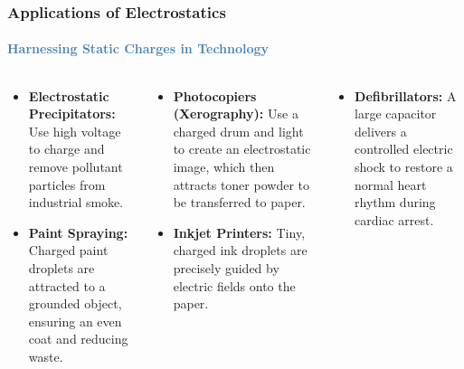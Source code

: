 \begin{frame}
\begin{frame}
\frametitle{\textsf{\textbf{Applications of Electrostatics}}}
\framesubtitle{\textcolor{steelblue}{Harnessing Static Charges in Technology}}

\begin{columns}[T]
    \begin{examplebox}
    \vspace{0.1cm}
    \begin{itemize}
        \item \textbf{Electrostatic Precipitators:} Use high voltage to charge and remove pollutant particles from industrial smoke.
        \item \textbf{Paint Spraying:} Charged paint droplets are attracted to a grounded object, ensuring an even coat and reducing waste.
    \end{itemize}
    \end{examplebox}
    
    \vspace{0.3cm}
    
    \begin{examplebox}
    \vspace{0.1cm}
    \begin{itemize}
        \item \textbf{Photocopiers (Xerography):} Use a charged drum and light to create an electrostatic image, which then attracts toner powder to be transferred to paper.
        \item \textbf{Inkjet Printers:} Tiny, charged ink droplets are precisely guided by electric fields onto the paper.
    \end{itemize}
    \end{examplebox}
    
    \begin{examplebox}
    \vspace{0.1cm}
    \begin{itemize}
        \item \textbf{Defibrillators:} A large capacitor delivers a controlled electric shock to restore a normal heart rhythm during cardiac arrest.
    \end{itemize}
    \end{examplebox}
    

\end{columns}
\end{frame}
\end{frame}
